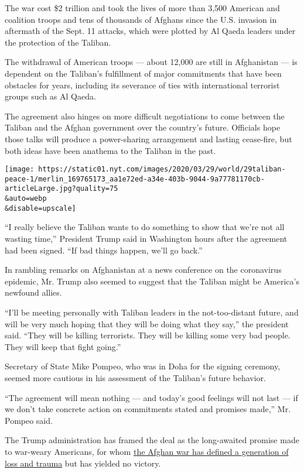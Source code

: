 The war cost \$2 trillion and took the lives of more than 3,500 American
and coalition troops and tens of thousands of Afghans since the U.S.
invasion in aftermath of the Sept. 11 attacks, which were plotted by Al
Qaeda leaders under the protection of the Taliban.

The withdrawal of American troops --- about 12,000 are still in
Afghanistan --- is dependent on the Taliban's fulfillment of major
commitments that have been obstacles for years, including its severance
of ties with international terrorist groups such as Al Qaeda.

The agreement also hinges on more difficult negotiations to come between
the Taliban and the Afghan government over the country's future.
Officials hope those talks will produce a power-sharing arrangement and
lasting cease-fire, but both ideas have been anathema to the Taliban in
the past.

\texttt{[image: https://static01.nyt.com/images/2020/03/29/world/29taliban-peace-1/merlin\_169765173\_aa1e72ed-a34e-403b-9044-9a77781170cb-articleLarge.jpg?quality=75\\\&auto=webp\\\&disable=upscale]}

``I really believe the Taliban wants to do something to show that we're
not all wasting time,'' President Trump said in Washington hours after
the agreement had been signed. ``If bad things happen, we'll go back.''

In rambling remarks on Afghanistan at a news conference on the
coronavirus epidemic, Mr. Trump also seemed to suggest that the Taliban
might be America's newfound allies.

``I'll be meeting personally with Taliban leaders in the not-too-distant
future, and will be very much hoping that they will be doing what they
say,'' the president said. ``They will be killing terrorists. They will
be killing some very bad people. They will keep that fight going.''

Secretary of State Mike Pompeo, who was in Doha for the signing
ceremony, seemed more cautious in his assessment of the Taliban's future
behavior.

``The agreement will mean nothing --- and today's good feelings will not
last --- if we don't take concrete action on commitments stated and
promises made,'' Mr. Pompeo said.

The Trump administration has framed the deal as the long-awaited promise
made to war-weary Americans, for whom
\href{https://www.nytimes.com/2020/02/29/world/asia/afghanistan-war-photos-pictures.html}{the
Afghan war has defined a generation of loss and trauma} but has yielded
no victory.

